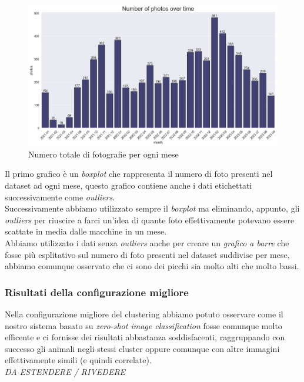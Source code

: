 \documentclass[12pt,a4paper,twoside]{article}
\begin{document}
\begin{figure}[!ht]
    \centering
    \includegraphics[width=\textwidth, height=\textheight, keepaspectratio]{assets/photos-month.png}
    \caption{Numero totale di fotografie per ogni mese}
    \label{fig:photos-month}
\end{figure}
Il primo grafico è un \textit{boxplot} che rappresenta il numero di foto presenti nel dataset ad 
ogni mese, questo grafico contiene anche i dati etichettati successivamente come 
\textit{outliers}.\\ 
Successivamente abbiamo utilizzato sempre il \textit{boxplot} ma eliminando, appunto, gli 
\textit{outliers} per riuscire a farci un'idea di quante foto effettivamente potevano essere 
scattate in media dalle macchine in un mese.\\
Abbiamo utilizzato i dati senza \textit{outliers} anche per creare un \textit{grafico a barre} 
che fosse più esplitativo sul numero di foto presenti nel dataset suddivise per mese, abbiamo 
comunque osservato che ci sono dei picchi sia molto alti che molto bassi.


\subsubsection{Risultati della configurazione migliore}
Nella configurazione migliore del clustering abbiamo potuto osservare come il nostro sistema 
basato su \textit{zero-shot image classification} fosse comunque molto efficente e ci fornisse 
dei risultati abbastanza soddisfacenti, raggruppando con successo gli animali negli stessi cluster 
oppure comunque con altre immagini effettivamente simili (e quindi correlate).\\ 
\textit{DA ESTENDERE / RIVEDERE}
\end{document}
